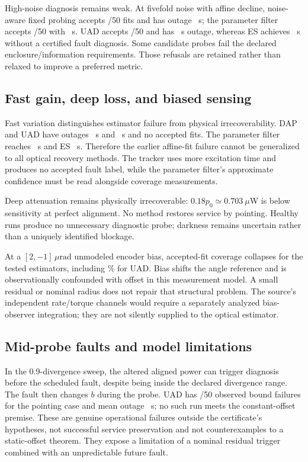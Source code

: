 \documentclass[10pt,journal]{IEEEtran}
\newcommand{\um}{\,\mu\mathrm{rad}}
\begin{document}
High-noise diagnosis remains weak. At fivefold noise with affine decline, noise-aware fixed probing accepts \GLSNoisyDriftAccepted/50 fits and has outage \GLSNoisyDriftOutage~s; the parameter filter accepts \KFNoisyDriftAccepted/50 with \KFNoisyDriftOutage~s. UAD accepts \UADNoisyDriftAccepted/50 and has \UADNoisyDriftOutage~s outage, whereas ES achieves \ESNoisyDriftOutage~s without a certified fault diagnosis. Some candidate probes fail the declared enclosure/information requirements. Those refusals are retained rather than relaxed to improve a preferred metric.

\subsection{Fast gain, deep loss, and biased sensing}
Fast variation distinguishes estimator failure from physical irrecoverability. DAP and UAD have outages \DAPFadingOutage~s and \UADFadingOutage~s and no accepted fits. The parameter filter reaches \KFFadingOutage~s and ES \ESFadingOutage~s. Therefore the earlier affine-fit failure cannot be generalized to all optical recovery methods. The tracker uses more excitation time and produces no accepted fault label, while the parameter filter's approximate confidence must be read alongside coverage measurements.

Deep attenuation remains physically irrecoverable: $0.18p_0\simeq0.703~\mu$W is below sensitivity at perfect alignment. No method restores service by pointing. Healthy runs produce no unnecessary diagnostic probe; darkness remains uncertain rather than a uniquely identified blockage.

At a $[2,-1]\um$ unmodeled encoder bias, accepted-fit coverage collapses for the tested estimators, including \UADBiasDriftCoverage\% for UAD. Bias shifts the angle reference and is observationally confounded with offset in this measurement model. A small residual or nominal radius does not repair that structural problem. The source's independent rate/torque channels would require a separately analyzed bias-observer integration; they are not silently supplied to the optical estimator.

\subsection{Mid-probe faults and model limitations}
In the 0.9-divergence sweep, the altered aligned power can trigger diagnosis before the scheduled fault, despite being inside the declared divergence range. The fault then changes $b$ during the probe. UAD has \UADBeamEarlyBoundFailures/50 observed bound failures for the pointing case and mean outage \UADBeamEarlyOutage~s; no such run meets the constant-offset premise. These are genuine operational failures outside the certificate's hypotheses, not successful service preservation and not counterexamples to a static-offset theorem. They expose a limitation of a nominal residual trigger combined with an unpredictable future fault.
\end{document}
